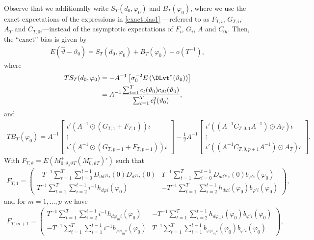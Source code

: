 {{Observe that we additionally write $S_T(d_0,\varphi_0)$ and $B_T(\varphi_0)$, where we use the exact expectations of the expressions in \eqref{exactbias1} —referred to as $F_{T,i}$, $G_{T,i}$, $A_T$ and $C_{T,0i}$—instead of the asymptotic expectations of $F_{i}$, $G_{i}$, $A$ and $C_{0i}$. Then, the ``exact'' bias is given by  
\begin{align*}
    E\left( \hat{\vartheta} - \vartheta_0 \right) = S_T(d_0,\varphi_0) + B_T(\varphi_0) + o(T^{-1}), 
\end{align*}
where 
\begin{align*}
    T S_T(d_0,\varphi_0) &= - A^{-1} \left[ \sigma^{-2}_0 E \left( \DLvt^*(\vartheta_0) \right)  \right]  \\
    &= A^{-1}  \frac{\sum_{t = 1}^T c_{t}(\vartheta_0) c_{\vartheta t}(\vartheta_0)}{\sum_{t = 1}^T c^2_{t}(\vartheta_0)},
\end{align*}
and 
\begin{align*}
    T B_T(\varphi_0) = A^{-1}   \begin{bmatrix}
\iota' \left( A^{-1} \odot \left( G_{T,1} + F_{T,1} \right)\right)\iota \\
\vdots    \\
\iota' \left( A^{-1} \odot\left( G_{T,p+1} + F_{T,p+1} \right) \right)\iota 
\end{bmatrix}  - \frac{1}{2} A^{-1} \begin{bmatrix}
\iota' \left(\left(A^{-1} C_{T,0,1} A^{-1} \right) \odot A_T \right) \iota \\
\vdots  \\
\iota' \left(\left(A^{-1} C_{T,0,p+1} A^{-1} \right) \odot A_T \right) \iota
\end{bmatrix} .
\end{align*}
With $F_{T,k} = E\left(M_{0,\vartheta_k\vartheta T}^{+} \left(M^+_{0,\vartheta T}\right)'  \right)$ such that  
\begin{align*}
    F_{T,1} = \begin{pmatrix}
-T^{-1} \sum_{t = 1}^T \sum_{i = 0}^{t-1}  D_{dd} \pi_i(0)  D_{d} \pi_i(0) &  T^{-1} \sum_{t = 1}^T \sum_{i = 0}^{t-1} D_{dd} \pi_i(0) b_{\varphi'i}(\varphi_0)  \\
 T^{-1} \sum_{t = 1}^T \sum_{i = 2}^{t-1} i^{-1} h_{d \varphi i}(\varphi_0)  & - T^{-1} \sum_{t = 1}^T \sum_{i = 2}^{t-1}    h_{d \varphi i}(\varphi_0) b_{\varphi' i}(\varphi_0) 
\end{pmatrix}, 
\end{align*}
and for $m = 1,\dots, p$ we have
\begin{align*}
    F_{T,m+1} = \begin{pmatrix}
  T^{-1} \sum_{t = 1}^T \sum_{i = 2}^{t-1}i^{-1} h_{d \varphi_m i}(\varphi_0)    & - T^{-1}\sum_{t = 1}^T \sum_{i = 2}^{t-1}    h_{d \varphi_{m} i}(\varphi_0) b_{\varphi' i}(\varphi_0)  \\
 -T^{-1} \sum_{t = 1}^T \sum_{i = 1}^{t-1} i^{-1} b_{\varphi \varphi_m i}(\varphi_0)  & T^{-1} \sum_{t = 1}^T \sum_{i = 1}^{t-1}  b_{\varphi \varphi_m i}(\varphi_0) b_{\varphi' i}(\varphi_0) 
\end{pmatrix},  
\end{align*}



}}
